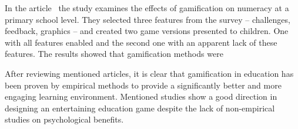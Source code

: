 In the article~\cite{nand_2019_engaging} the study examines the effects of gamification on numeracy at a primary school level.
They selected three features from the survey -- challenges, feedback, graphics -- and created two game versions presented to children.
One with all features enabled and the second one with an apparent lack of these features.
The results showed that gamification methods were 

After reviewing mentioned articles, it is clear that gamification in education has been proven by empirical methods to provide a significantly better and more engaging learning environment.
Mentioned studies show a good direction in designing an entertaining education game despite the lack of non-empirical studies on psychological benefits.
